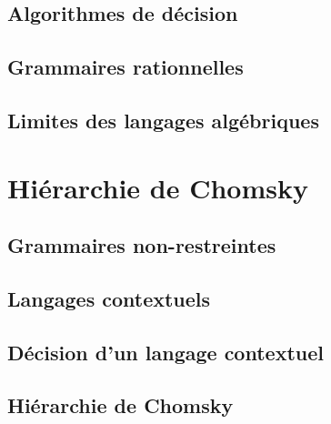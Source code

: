 \subsection{Algorithmes de décision}




 
\subsection{Grammaires rationnelles}







 
\subsection{Limites des langages algébriques}



 
\section{Hiérarchie de Chomsky}
 
\subsection{Grammaires non-restreintes}




 
\subsection{Langages contextuels}



 
\subsection{Décision d'un langage contextuel}



 
\subsection{Hiérarchie de Chomsky}





